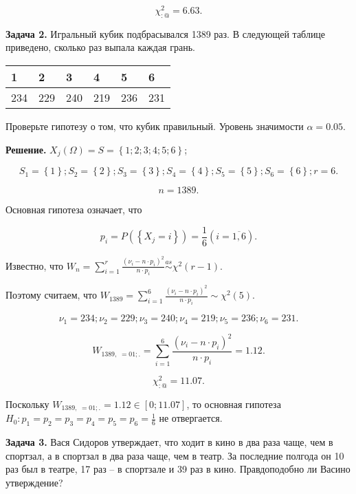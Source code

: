 \[\chi _{:@}^{2} =6.63.\] 



\textbf{Задача 2.} Игральный кубик подбрасывался 1389 раз. В следующей таблице приведено, сколько раз выпала каждая грань.

\begin{tabular}{|p{0.3in}|p{0.3in}|p{0.3in}|p{0.3in}|p{0.3in}|p{0.3in}|} \hline 
1 & 2 & 3 & 4 & 5 & 6 \\ \hline 
234 & 229 & 240 & 219 & 236 & 231 \\ \hline 
\end{tabular}

Проверьте гипотезу о том, что кубик правильный. Уровень значимости $\alpha =0.05$.

\textbf{Решение.} $X_{j} \left(\Omega \right)=S=\left\{1;2;3;4;5;6\right\}$;

\[S_{1} =\left\{1\right\}; S_{2} =\left\{2\right\}; S_{3} =\left\{3\right\}; S_{4} =\left\{4\right\}; S_{5} =\left\{5\right\}; S_{6} =\left\{6\right\}; r=6.\] 

\[n=1389.\] 

Основная гипотеза означает, что

\[p_{i} =P\left(\left\{X_{j} =i\right\}\right)=\frac{1}{6}  \left(i=\overline{1,6}\right).\] 

Известно, что $W_{n} =\sum _{i=1}^{r}\frac{\left(\nu _{i} -n\cdot p_{i} \right)^{2} }{n\cdot p_{i} }  \mathop{\sim }\limits^{as} \chi ^{2} \left(r-1\right)$.

Поэтому считаем, что $W_{1389} =\sum _{i=1}^{6}\frac{\left(\nu _{i} -n\cdot p_{i} \right)^{2} }{n\cdot p_{i} }  \sim \chi ^{2} \left(5\right)$.

\[\nu _{1} =234; \nu _{2} =229; \nu _{3} =240; \nu _{4} =219; \nu _{5} =236; \nu _{6} =231.\] 

\[W_{1389,\; =01;.} =\sum _{i=1}^{6}\frac{\left(\nu _{i} -n\cdot p_{i} \right)^{2} }{n\cdot p_{i} }  =1.12.\] 

\[\chi _{:@}^{2} =11.07.\] 

Поскольку $W_{1389,\; =01;.} =1.12\in \left[0;11.07\right]$, то основная гипотеза $H_{0} :p_{1} =p_{2} =p_{3} =p_{4} =p_{5} =p_{6} ={\tfrac{1}{6}} $ не отвергается.



\textbf{Задача 3.} Вася Сидоров утверждает, что ходит в кино в два раза чаще, чем в спортзал, а в спортзал  в два раза чаще, чем в театр. За последние полгода он 10 раз был в театре, 17 раз -- в спортзале и 39 раз в кино. Правдоподобно ли Васино утверждение?



